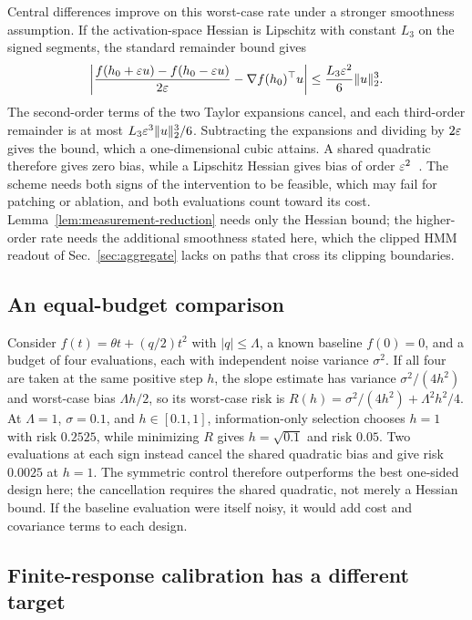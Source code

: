 Central differences improve on this worst-case rate under a stronger
smoothness assumption. If the activation-space Hessian is Lipschitz with
constant $L_3$ on the signed segments, the standard remainder bound gives
\begin{equation}\label{eq:bd-central}
 \left|\frac{f(h_0+\varepsilon u)-f(h_0-\varepsilon u)}{2\varepsilon}
       -\nabla f(h_0)^\top u\right|
 \leq\frac{L_3\varepsilon^2}{6}\|u\|_2^3.
\end{equation}
The second-order terms of the two Taylor expansions cancel, and each
third-order remainder is at most $L_3\varepsilon^3\|u\|_2^3/6$. Subtracting the
expansions and dividing by $2\varepsilon$ gives the bound, which a one-dimensional
cubic attains. A shared quadratic therefore gives zero bias, while a
Lipschitz Hessian gives bias of order $\varepsilon^2$~\cite{shi2022finite}.
The scheme needs both signs of the intervention to be feasible, which may
fail for patching or ablation, and both evaluations count toward its cost.
Lemma~\ref{lem:measurement-reduction} needs only the Hessian bound; the
higher-order rate needs the additional smoothness stated here, which the
clipped HMM readout of Sec.~\ref{sec:aggregate} lacks on paths that cross its
clipping boundaries.

\subsection{An equal-budget comparison}

Consider $f(t)=\theta t+(q/2)t^2$ with $|q|\leq\Lambda$, a known baseline
$f(0)=0$, and a budget of four evaluations, each with independent noise
variance $\sigma^2$. If all four are taken at the same positive step $h$,
the slope estimate has variance $\sigma^2/(4h^2)$ and worst-case bias
$\Lambda h/2$, so its worst-case risk is
$R(h)=\sigma^2/(4h^2)+\Lambda^2h^2/4$.
At $\Lambda=1$, $\sigma=0.1$, and $h\in[0.1,1]$, information-only selection
chooses $h=1$ with risk $0.2525$, while minimizing $R$ gives $h=\sqrt{0.1}$
and risk $0.05$. Two evaluations at each sign instead cancel the shared
quadratic bias and give risk $0.0025$ at $h=1$.
The symmetric control therefore outperforms the best one-sided design here;
the cancellation requires the shared quadratic, not merely a Hessian bound.
If the baseline evaluation were itself noisy, it would add cost and
covariance terms to each design.

\subsection{Finite-response calibration has a different target}

